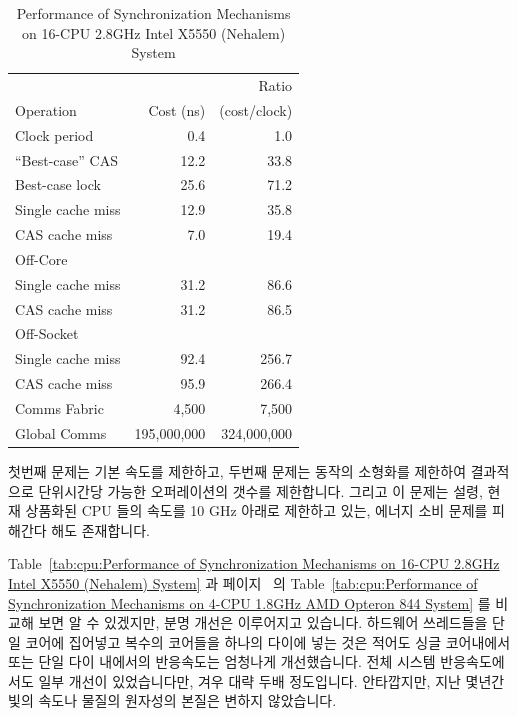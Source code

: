 \begin{enumerate}
\begin{table}
\centering
\begin{tabular}{l||r|r}
				& 	 	& Ratio \\
	Operation		& Cost (ns) 	& (cost/clock) \\
	\hline
	\hline
	Clock period		&           0.4	&           1.0 \\
	\hline
	``Best-case'' CAS	&          12.2	&          33.8 \\
	\hline
	Best-case lock		&          25.6	&          71.2 \\
	\hline
	Single cache miss	&          12.9	&          35.8 \\
	\hline
	CAS cache miss		&           7.0	&          19.4 \\
	\hline
	Off-Core		&		&		\\
	\hline
	Single cache miss	&          31.2	&          86.6 \\
	\hline
	CAS cache miss		&          31.2	&          86.5 \\
	\hline
	Off-Socket		&		&		\\
	\hline
	Single cache miss	&          92.4	&         256.7 \\
	\hline
	CAS cache miss		&          95.9	&         266.4 \\
	\hline
	Comms Fabric		&       4,500	&       7,500 \\
	\hline
	Global Comms		& 195,000,000	& 324,000,000 \\
\end{tabular}
\caption{Performance of Synchronization Mechanisms on 16-CPU 2.8GHz Intel X5550 (Nehalem) System}
\label{tab:cpu:Performance of Synchronization Mechanisms on 16-CPU 2.8GHz Intel X5550 (Nehalem) System}
\end{table}

	첫번째 문제는 기본 속도를 제한하고, 두번째 문제는 동작의 소형화를
	제한하여 결과적으로 단위시간당 가능한 오퍼레이션의 갯수를 제한합니다.
	그리고 이 문제는 설령, 현재 상품화된 CPU 들의 속도를 10 GHz 아래로
	제한하고 있는, 에너지 소비 문제를 피해간다 해도 존재합니다.

	Table~\ref{tab:cpu:Performance of Synchronization Mechanisms on 16-CPU
	2.8GHz Intel X5550 (Nehalem) System} 과
	페이지~\pageref{tab:cpu:Performance of Synchronization Mechanisms on
	4-CPU 1.8GHz AMD Opteron 844 System} 의 Table~\ref{tab:cpu:Performance
	of Synchronization Mechanisms on 4-CPU 1.8GHz AMD Opteron 844 System}
	를 비교해 보면 알 수 있겠지만, 분명 개선은 이루어지고 있습니다.
	하드웨어 쓰레드들을 단일 코어에 집어넣고 복수의 코어들을 하나의 다이에
	넣는 것은 적어도 싱글 코어내에서 또는 단일 다이 내에서의 반응속도는
	엄청나게 개선했습니다.
	전체 시스템 반응속도에서도 일부 개선이 있었습니다만, 겨우 대략 두배
	정도입니다.
	안타깝지만, 지난 몇년간 빛의 속도나 물질의 원자성의 본질은 변하지
	않았습니다.


\end{enumerate}
